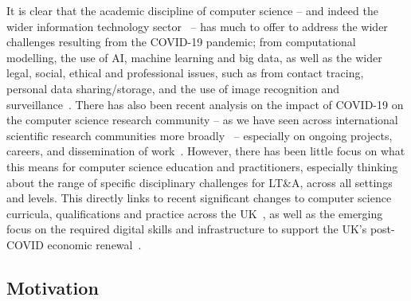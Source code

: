 \documentclass[sigconf]{acmart}
\begin{document}
It is clear that the academic discipline of computer science -- and
indeed the wider information technology sector~\cite{bcs:2020} -- has
much to offer to address the wider challenges resulting from the
COVID-19 pandemic; from computational modelling, the use of AI,
machine learning and big data, as well as the wider legal, social,
ethical and professional issues, such as from contact tracing,
personal data sharing/storage, and the use of image recognition and
surveillance~\cite{ting-et-al:2020,cerf:2020,chun-et-al:2020,bbcnews:2020}. There
has also been recent analysis on the impact of COVID-19 on the
computer science research community -- as we have seen across
international scientific research communities more
broadly~\cite{oecdcovid19:2020} -- especially on ongoing projects,
careers, and dissemination of work~\cite{msrcovid19:2020}. However,
there has been little focus on what this means for computer science
education and practitioners, especially thinking about the range of
specific disciplinary challenges for LT\&A, across all settings and
levels. This directly links to recent significant changes to computer
science curricula, qualifications and practice across the
UK~\cite{brown-et-al-toce2014,davenport-et-al:latice2016,
murphy-et-al:programming2017, prickett-et-al:iticse2020}, as well as
the emerging focus on the required digital skills and infrastructure
to support the UK's post-COVID economic
renewal~\cite{tryfonas+crick:petra2018,crick-et-al:fie2019,davenport-et-al:educon2020}.


\subsection{Motivation}
\end{document}

